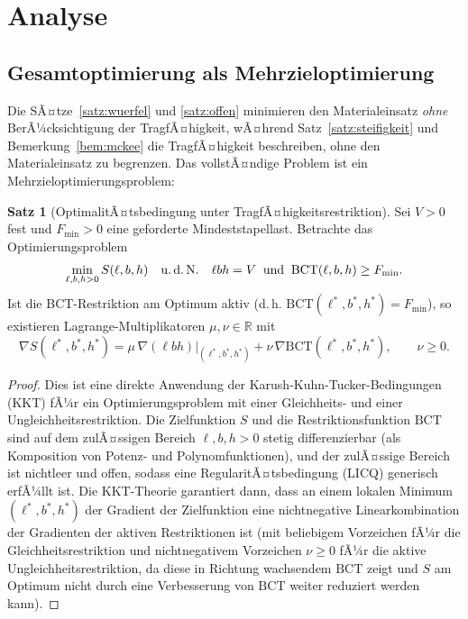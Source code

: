 ﻿\documentclass[a4paper,12pt]{article}
\theoremstyle{definition}
\newtheorem{satz}{Satz}
\begin{document}
\section{Analyse}

\subsection{Gesamtoptimierung als Mehrzieloptimierung}

Die SÃ¤tze~\ref{satz:wuerfel} und \ref{satz:offen} minimieren den Materialeinsatz
\emph{ohne} BerÃ¼cksichtigung der TragfÃ¤higkeit, wÃ¤hrend Satz~\ref{satz:steifigkeit}
und Bemerkung~\ref{bem:mckee} die TragfÃ¤higkeit beschreiben, ohne den
Materialeinsatz zu begrenzen. Das vollstÃ¤ndige Problem ist ein
Mehrzieloptimierungsproblem:

\begin{satz}[OptimalitÃ¤tsbedingung unter TragfÃ¤higkeitsrestriktion]
	\label{satz:lagrange}
	Sei $V > 0$ fest und $F_{\min} > 0$ eine geforderte Mindeststapellast.
	Betrachte das Optimierungsproblem
	\[
		\min_{\ell,b,h > 0} S(\ell,b,h) \quad \text{u.\,d.\,N.} \quad
		\ell b h = V \;\;\text{und}\;\; \mathrm{BCT}(\ell,b,h) \geq F_{\min}.
	\]
	Ist die BCT-Restriktion am Optimum aktiv (d.\,h.
	$\mathrm{BCT}(\ell^\ast,b^\ast,h^\ast) = F_{\min}$), so existieren
	Lagrange-Multiplikatoren $\mu, \nu \in \mathbb{R}$ mit
	\[
		\nabla S(\ell^\ast,b^\ast,h^\ast)
		= \mu \,\nabla(\ell b h)\big|_{(\ell^\ast,b^\ast,h^\ast)}
		+ \nu \,\nabla \mathrm{BCT}(\ell^\ast,b^\ast,h^\ast),
		\qquad \nu \geq 0.
	\]
\end{satz}

\begin{proof}
	Dies ist eine direkte Anwendung der Karush-Kuhn-Tucker-Bedingungen (KKT)
	fÃ¼r ein Optimierungsproblem mit einer Gleichheits- und einer
	Ungleichheitsrestriktion. Die Zielfunktion $S$ und die Restriktionsfunktion
	$\mathrm{BCT}$ sind auf dem zulÃ¤ssigen Bereich $\ell,b,h>0$ stetig
	differenzierbar (als Komposition von Potenz- und Polynomfunktionen), und
	der zulÃ¤ssige Bereich ist nichtleer und offen, sodass eine
	RegularitÃ¤tsbedingung (LICQ) generisch erfÃ¼llt ist. Die KKT-Theorie
	garantiert dann, dass an einem lokalen Minimum $(\ell^\ast,b^\ast,h^\ast)$
	der Gradient der Zielfunktion eine nichtnegative Linearkombination der
	Gradienten der aktiven Restriktionen ist (mit beliebigem Vorzeichen fÃ¼r die
	Gleichheitsrestriktion und nichtnegativem Vorzeichen $\nu \geq 0$ fÃ¼r die
	aktive Ungleichheitsrestriktion, da diese in Richtung wachsendem
	$\mathrm{BCT}$ zeigt und $S$ am Optimum nicht durch eine Verbesserung von
	$\mathrm{BCT}$ weiter reduziert werden kann).
\end{proof}
\end{document}
